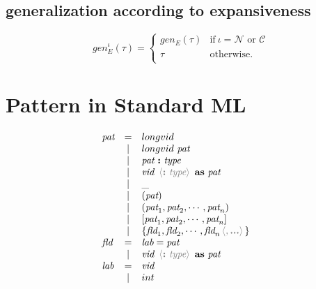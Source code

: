 \documentclass[11pt,a4paper]{article}
\newcommand{\key}[1]{\textrm{\textbf{#1}}}
\newcommand{\prodlhs}[1]{\textit{#1}}
\newcommand{\braced}[1]{\{#1\}}
\newcommand{\angled}[1]{\,{\color{gray}\langle#1\rangle}\,}
\newcommand{\xpc}{\mathcal{C}}
\newcommand{\nxp}{\mathcal{N}}
\begin{document}
\subsection {generalization according to expansiveness}
\[ 
	gen_E^\iota(\tau) = \left\{\begin{array}{cl}
						gen_E(\tau)	& \textrm{if}\ \iota = \nxp \textrm{ or } \xpc \\
						\tau		& \textrm{otherwise.}				\\
						\end{array}\right.
\]

\section {Pattern in Standard ML}
{\renewcommand{\arraystretch}{1.2}\[
\begin{array}{lcll}
\prodlhs{pat}
    & = & longvid                                                                   &\\        
    & | & longvid \ \prodlhs{pat}                                                   &\\
    & | & \prodlhs{pat}\ \key{:}\ \prodlhs{type}                                    &\\
    & | & \prodlhs{vid}\ \angled{\key{:}\ \prodlhs{type}}\ \key{as}\ \prodlhs{pat}  &\\
    & | & \_                                                                        &\\
    & | & (\prodlhs{pat})                                                           &\\
    & | & (\prodlhs{pat}_1,\prodlhs{pat}_2,\cdots,\prodlhs{pat}_n)                  &\\
    & | & [\prodlhs{pat}_1,\prodlhs{pat}_2,\cdots,\prodlhs{pat}_n]                  &\\
    & | & \braced{\prodlhs{fld}_1,\prodlhs{fld}_2,\cdots,\prodlhs{fld}_n\angled{,\key{...}}}  &\\
\prodlhs{fld}
    & = & \prodlhs{lab} = \prodlhs{pat}                                             &\\
    & | & \prodlhs{vid}\ \angled{\key{:}\ \prodlhs{type}}\ \key{as}\ \prodlhs{pat}  &\\
\prodlhs{lab}
    & = & \prodlhs{vid}                                                             &\\
    & | & int                                                                       &\\    
\end{array}
\]}
\end{document}
